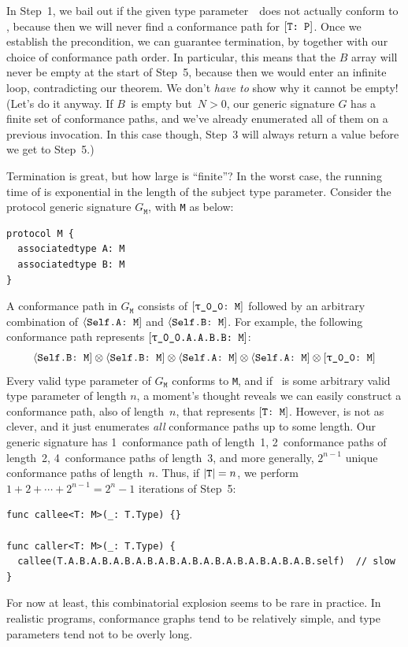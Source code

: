 \documentclass[../generics]{subfiles}
\begin{document}
In Step~1, we bail out if the given type parameter~\tT\ does not actually conform to \tP, because then we will never find a conformance path for $[\texttt{T:~P}]$. Once we establish the precondition, we can guarantee termination, by  together with our choice of conformance path order. In particular, this means that the $B$ array will never be empty at the start of Step~5, because then we would enter an infinite loop, contradicting our theorem. We don't \emph{have to} show why it cannot be empty! (Let's do it anyway. If $B$~is empty but~$N>0$, our generic signature $G$ has a finite set of conformance paths, and we've already enumerated all of them on a previous invocation. In this case though, Step~3 will always return a value before we get to Step~5.)

\begin{example}\label{free monoid first time}
Termination is great, but how large is ``finite''? In the worst case, the running time of  is exponential in the length of the subject type parameter. Consider the protocol generic signature $G_\texttt{M}$, with \texttt{M} as below:
\begin{Verbatim}
protocol M {
  associatedtype A: M
  associatedtype B: M
}
\end{Verbatim}
A conformance path in $G_{\texttt{M}}$ consists of $\ConfReq{\rT}{M}$ followed by an arbitrary combination of $\langle\texttt{Self.A:~M}]$ and $\langle\texttt{Self.B:~M}]$. For example, the following conformance path represents $\ConfReq{\rT.A.A.B.B}{M}$:
\[
\AssocConf{Self.B}{M} \otimes \AssocConf{Self.B}{M} \otimes \AssocConf{Self.A}{M} \otimes \AssocConf{Self.A}{M} \otimes \ConfReq{\rT}{M}
\]
Every valid type parameter of $G_\texttt{M}$ conforms to \texttt{M}, and if \tT\ is some arbitrary valid type parameter of length $n$, a moment's thought reveals we can easily construct a conformance path, also of length~$n$, that represents $[\texttt{T:~M}]$. However,  is not as clever, and it just enumerates \emph{all} conformance paths up to some length. Our generic signature has 1~conformance path of length~1, 2~conformance paths of length~2, 4~conformance paths of length~3, and more generally, $2^{n-1}$ unique conformance paths of length~$n$. Thus, if $|\texttt{T}|=n$, we perform $1+2+\cdots+2^{n-1}=2^n-1$ iterations of Step~5:
\begin{Verbatim}
func callee<T: M>(_: T.Type) {}

func caller<T: M>(_: T.Type) {
  callee(T.A.B.A.B.A.B.A.B.A.B.A.B.A.B.A.B.A.B.A.B.A.B.self)  // slow
}
\end{Verbatim}
For now at least, this combinatorial explosion seems to be rare in practice. In realistic programs, conformance graphs tend to be relatively simple, and type parameters tend not to be overly long.
\end{example}
\end{document}
